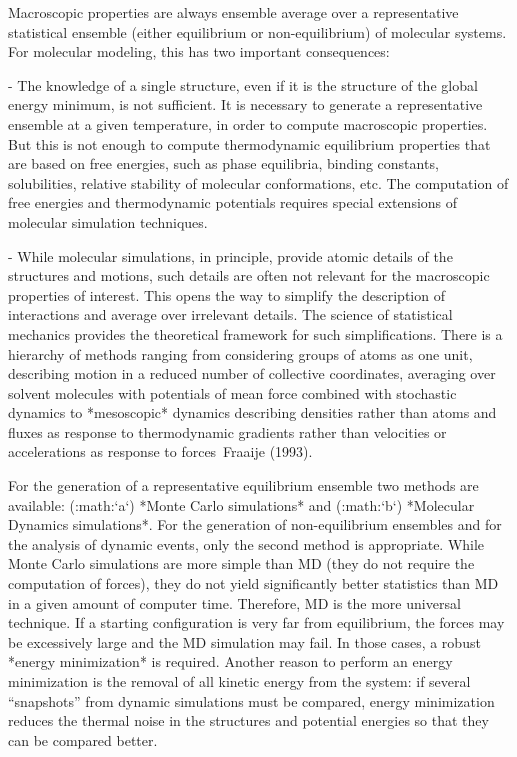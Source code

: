Macroscopic properties are always ensemble
average
over a representative statistical ensemble (either equilibrium or
non-equilibrium) of molecular systems. For molecular modeling, this has
two important consequences:

-  The knowledge of a single structure, even if it is the structure of
   the global energy minimum, is not sufficient. It is necessary to
   generate a representative ensemble at a given temperature, in order
   to compute macroscopic properties. But this is not enough to compute
   thermodynamic equilibrium properties that are based on free energies,
   such as phase equilibria, binding constants, solubilities, relative
   stability of molecular conformations, etc. The computation of free
   energies and thermodynamic potentials requires special extensions of
   molecular simulation techniques.

-  While molecular simulations, in principle, provide atomic details of
   the structures and motions, such details are often not relevant for
   the macroscopic properties of interest. This opens the way to
   simplify the description of interactions and average over irrelevant
   details. The science of statistical
   mechanics
   provides the theoretical framework for such simplifications. There is
   a hierarchy of methods ranging from considering groups of atoms as
   one unit, describing motion in a reduced number of collective
   coordinates, averaging over solvent molecules with potentials of mean
   force combined with stochastic
   dynamics
   to *mesoscopic*
   dynamics
   describing densities rather than atoms and fluxes as response to
   thermodynamic gradients rather than velocities or accelerations as
   response to forces Fraaije (1993).

For the generation of a representative equilibrium ensemble two methods
are available: (:math:`a`) *Monte Carlo simulations* and (:math:`b`)
*Molecular Dynamics simulations*. For the generation of non-equilibrium
ensembles and for the analysis of dynamic events, only the second method
is appropriate. While Monte Carlo simulations are more simple than MD
(they do not require the computation of forces), they do not yield
significantly better statistics than MD in a given amount of computer
time. Therefore, MD is the more universal technique. If a starting
configuration is very far from equilibrium, the forces may be
excessively large and the MD simulation may fail. In those cases, a
robust *energy minimization* is required. Another reason to perform an
energy minimization is the removal of all kinetic energy from the
system: if several “snapshots” from dynamic simulations must be
compared, energy minimization reduces the thermal noise in the
structures and potential energies so that they can be compared better.

